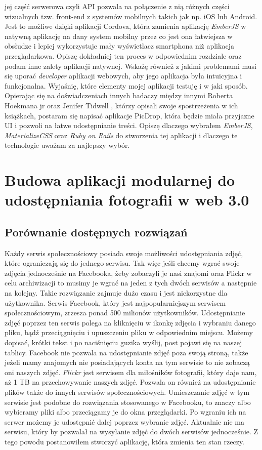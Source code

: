 \documentclass[brudnopis]{xmgr}
\begin{document}
jej część serwerowa czyli API pozwala na połączenie z nią różnych części wizualnych tzw. front-end z systemów mobilnych takich jak np. iOS lub Android. Jest to możliwe dzięki aplikacji Cordova, która zamienia aplikację \textit{EmberJS} w natywną aplikację na dany system mobilny przez co jest ona łatwiejsza w obsłudze i lepiej wykorzystuje mały wyświetlacz smartphona niż aplikacja przeglądarkowa. Opiszę dokładniej ten proces w odpowiednim rozdziale oraz podam inne zalety aplikacji natywnej. Wskażę również z jakimi problemami musi się uporać \textit{developer} aplikacji webowych, aby jego aplikacja była intuicyjna i funkcjonalna. Wyjaśnię, które elementy mojej aplikacji testuję i w jaki sposób. Opierając się na  doświadczeniach innych badaczy  między innymi Roberta Hoekmana jr  \cite {magiaUI} oraz Jenifer Tidwell  \cite {projektowanieUI}, którzy opisali swoje spostrzeżenia w ich książkach, postaram się napisać aplikacje PicDrop, która  będzie miała przyjazne UI i pozwoli na łatwe udostępnianie treści. Opiszę dlaczego wybrałem \textit{EmberJS}, \textit{MaterializeCSS} oraz \textit{Ruby on Rails} do stworzenia tej aplikacji i dlaczego te technologie uważam za najlepszy wybór.


\chapter{Budowa aplikacji modularnej do udostępniania fotografii  w web 3.0}

\section{Porównanie dostępnych rozwiązań}
Każdy serwis społecznościowy posiada swoje możliwości udostępniania zdjęć, które ograniczają się do jednego serwisu. Tak więc jeśli chcemy wgrać swoje zdjęcia jednocześnie na Facebooka, żeby zobaczyli je nasi znajomi oraz Flickr w celu archiwizacji to musimy je wgrać na jeden z tych dwóch serwisów a następnie na kolejny. Takie rozwiązanie zajmuje dużo czasu i jest niekorzystne dla użytkownika. Serwis Facebook, który jest najpopularniejszym serwisem społecznościowym, zrzesza ponad 500 milionów użytkowników. Udostępnianie zdjęć poprzez ten serwis polega na kliknięciu w ikonkę zdjęcia i wybraniu danego pliku, bądź przeciągnięciu i upuszczeniu pliku w odpowiednim miejscu. Możemy dopisać, krótki tekst i po naciśnięciu guzika wyślij, post pojawi się na naszej tablicy. Facebook nie pozwala na udostępnianie zdjęć poza swoją stroną, także jeżeli mamy znajomych nie posiadających konta na tym serwisie to nie zobaczą oni naszych zdjęć. \newline \indent \textit{Flickr} jest serwisem dla miłośników fotografii, który daje nam, aż 1 TB na przechowywanie naszych zdjęć. Pozwala on również na udostępnianie plików także do innych serwisów społecznościowych. Umieszczanie zdjęć w tym serwisie jest podobne do rozwiązania stosowanego w Facebooku, to znaczy albo wybieramy pliki albo przeciągamy je do okna przeglądarki. Po wgraniu ich na serwer możemy je udostępnić dalej poprzez wybranie zdjęć. Aktualnie nie ma serwisu, który by pozwalał na wysyłanie zdjęć do dwóch serwisów jednocześnie. Z tego powodu postanowiłem stworzyć aplikację, która zmienia ten stan rzeczy.
\end{document}
